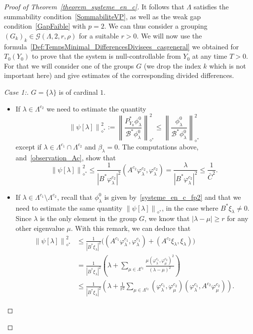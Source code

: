\documentclass[11pt]{article}
\theoremstyle{definition}
\numberwithin{equation}{section}
\numberwithin{figure}{section}
\numberwithin{table}{section}
\newenvironment{step}[1]{\begin{proof}[#1]}{\let\qed\relax\end{proof}}
\newcommand{\fprop}[2]{\varphi^{#1}_{#2}}
\newcommand\Bs{\mathcal{B}^*}
\newcommand{\Fzp}{Y_0}
\newcommand{\normeXalphas}[1]{\left\| #1 \right\|_{\diamond^*}}
\newcommand{\PFa}{P_{\Fzp}^*}
\begin{document}
\begin{proof}[Proof of Theorem~\ref{theorem_systeme_en_c}]
It follows that $\Lambda$ satisfies the summability condition~\eqref{SommabiliteVP}, as well as the weak gap condition~\eqref{GapFaible} with $p=2$. We can thus consider a grouping $(G_k)_k\in \mathcal{G}(\Lambda,2,r,\rho)$ for a suitable $r>0$. We will now use the formula~\eqref{Def:TempsMinimal_DifferencesDivisees_casgeneral} we obtained for $T_0(\Fzp)$ to prove that the system is null-controllable from $\Fzp$ at any time $T>0$. For that we will consider one of the groups $G$ (we drop the index $k$ which is not important here) and give estimates of the corresponding divided differences.
\begin{step}{Case 1:} $G=\{\lambda\}$ is of cardinal $1$.
\begin{itemize}
\item If $\lambda\in \Lambda^{c_2}$ we need to estimate the quantity
\[
\normeXalphas{\psi[\lambda]}^2:=\normeXalphas{\frac{\PFa \phi_\lambda^0}{\Bs \phi_\lambda^0}}^2\leq \normeXalphas{\frac{\phi_\lambda^0}{\Bs \phi_\lambda^0}}^2
\]
except if $\lambda\in \Lambda^{c_1}\cap \Lambda^{c_2}$ and $\beta_\lambda=0$. The computations above, and~\eqref{observation_Ac}, show that
\[
\normeXalphas{\psi[\lambda]}^2\leq \frac{1}{|B^* \fprop{c_2}{\lambda}|^2} (A^{c_2} \fprop{c_2}{\lambda},\fprop{c_2}{\lambda}) = \frac{\lambda}{|B^* \fprop{c_2}{\lambda}|^2} \leq \frac{1}{\bar{C}^2}.
\]
\item If $\lambda\in \Lambda^{c_1}\setminus \Lambda^{c_2}$, recall that $\phi_\lambda^0$ is given by~\eqref{systeme_en_c_fp2} and that we need to estimate the same quantity $\normeXalphas{\psi[\lambda]}$, in the case where $B^*\xi_\lambda\neq 0$. Since $\lambda$ is the only element in the group $G$, we know that $|\lambda-\mu|\geq r$ for any other eigenvalue $\mu$. With this remark, we can deduce that
\begin{align*}
\normeXalphas{\psi[\lambda]}^2 & \leq \frac{1}{|B^* \xi_\lambda|^2} \big((A^{c_1}\fprop{c_1}{\lambda},\fprop{c_1}{\lambda}) + (A^{c_2} \xi_\lambda,\xi_\lambda) \big)\\
& = \frac{1}{|B^* \xi_\lambda|^2} \left(\lambda + \sum_{\mu\in \Lambda^{c_2}} \frac{\mu(\fprop{c_1}{\lambda},\fprop{c_2}{\mu})^2}{(\lambda-\mu)^2} \right) \\
& \leq \frac{1}{|B^* \xi_\lambda|^2} \left(\lambda + \frac{1}{r^2}\sum_{\mu\in \Lambda^{c_2}} (\fprop{c_1}{\lambda},\fprop{c_2}{\mu}) (\fprop{c_1}{\lambda},A^{c_2} \fprop{c_2}{\mu}) \right).
\end{align*}



\end{itemize}
\end{step}
\end{proof}
\end{document}
